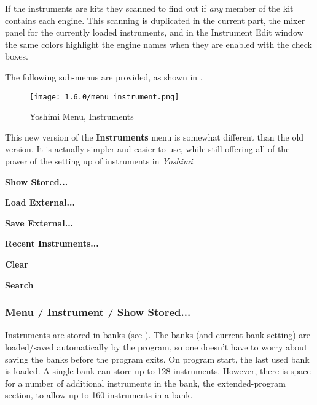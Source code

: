    If the instruments are kits they scanned to find out if
   \textsl{any} member of the kit contains each engine.
   This scanning is duplicated in the current part, the mixer panel for the
   currently loaded instruments, and in the Instrument Edit window the same
   colors highlight the engine names when they are enabled with the check
   boxes.

   The following sub-menus are provided, as shown in
   .

\begin{figure}[H]
   \centering
   \texttt{[image: 1.6.0/menu\_instrument.png]}
   \caption{Yoshimi Menu, Instruments}
   \label{fig:yoshimi_instrument_menu}
\end{figure}

   This new version of the \textbf{Instruments}
   menu is somewhat different than
   the old version.  It is actually simpler and easier to use, while still
   offering all of the power of the setting up of instruments in
   \textsl{Yoshimi}.

   \begin{enumber}
      \item \textbf{Show Stored...}
      \item \textbf{Load External...}
      \item \textbf{Save External...}
      \item \textbf{Recent Instruments...}
      \item \textbf{Clear}
      \item \textbf{Search}
   \end{enumber}


\subsubsection{Menu / Instrument / Show Stored...}
\label{subsubsec:menu_instrument_show}

   Instruments are stored in banks
   (see ).
   The banks (and current bank setting) are
   loaded/saved automatically by the program, so one doesn't have to worry
   about saving the banks before the program exits. On program start, the last
   used bank is loaded. A single bank can store up to 128 instruments.
   However, there is space for a number of additional instruments in the bank,
   the extended-program section, to allow up to 160 instruments in a bank.

